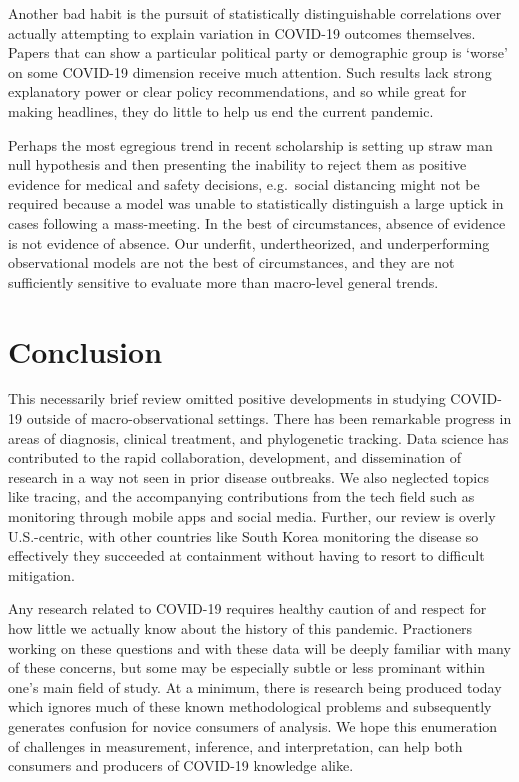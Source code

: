 \documentclass[10pt,letterpaper]{article}
\begin{document}
Another bad habit is the pursuit of statistically distinguishable
correlations over actually attempting to explain variation in COVID-19
outcomes themselves. Papers that can show a particular political party
or demographic group is `worse' on some COVID-19 dimension receive much
attention. Such results lack strong explanatory power or clear policy
recommendations, and so while great for making headlines, they do little
to help us end the current pandemic.

Perhaps the most egregious trend in recent scholarship is setting up
straw man null hypothesis and then presenting the inability to reject
them as positive evidence for medical and safety decisions, e.g.~social
distancing might not be required because a model was unable to
statistically distinguish a large uptick in cases following a
mass-meeting. In the best of circumstances, absence of evidence is not
evidence of absence. Our underfit, undertheorized, and underperforming
observational models are not the best of circumstances, and they are not
sufficiently sensitive to evaluate more than macro-level general trends.

\section{Conclusion}\label{conclusion}

This necessarily brief review omitted positive developments in studying
COVID-19 outside of macro-observational settings. There has been
remarkable progress in areas of diagnosis, clinical treatment, and
phylogenetic tracking. Data science has contributed to the rapid
collaboration, development, and dissemination of research in a way not
seen in prior disease outbreaks. We also neglected topics like tracing,
and the accompanying contributions from the tech field such as
monitoring through mobile apps and social media. Further, our review is
overly U.S.-centric, with other countries like South Korea monitoring
the disease so effectively they succeeded at containment without having
to resort to difficult mitigation.

Any research related to COVID-19 requires healthy caution of and respect
for how little we actually know about the history of this pandemic.
Practioners working on these questions and with these data will be
deeply familiar with many of these concerns, but some may be especially
subtle or less prominant within one's main field of study. At a minimum,
there is research being produced today which ignores much of these known
methodological problems and subsequently generates confusion for novice
consumers of analysis. We hope this enumeration of challenges in
measurement, inference, and interpretation, can help both consumers and
producers of COVID-19 knowledge alike.
\end{document}
